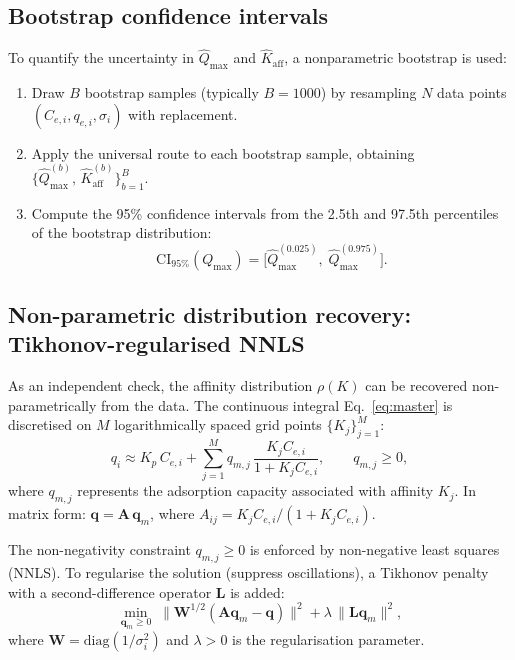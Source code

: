 \documentclass[12pt]{article}
\begin{document}
\subsection{Bootstrap confidence intervals}

To quantify the uncertainty in $\widehat{Q}_{\max}$ and
$\widehat{K}_{\mathrm{aff}}$, a nonparametric bootstrap is used:
\begin{enumerate}[nosep]
  \item Draw $B$ bootstrap samples (typically $B = 1000$) by
        resampling $N$ data points $(C_{e,i}, q_{e,i}, \sigma_i)$
        with replacement.
  \item Apply the universal route to each bootstrap sample, obtaining
        $\{\widehat{Q}_{\max}^{(b)},\, \widehat{K}_{\mathrm{aff}}^{(b)}\}_{b=1}^{B}$.
  \item Compute the 95\% confidence intervals from the 2.5th and
        97.5th percentiles of the bootstrap distribution:
        \begin{equation}
          \mathrm{CI}_{95\%}(Q_{\max})
          = \bigl[\widehat{Q}_{\max}^{(0.025)},\;
                   \widehat{Q}_{\max}^{(0.975)}\bigr].
        \end{equation}
\end{enumerate}

\subsection{Non-parametric distribution recovery: Tikhonov-regularised NNLS}

As an independent check, the affinity distribution $\rho(K)$ can be
recovered non-parametrically from the data.  The continuous integral
Eq.~\eqref{eq:master} is discretised on $M$ logarithmically spaced
grid points $\{K_j\}_{j=1}^{M}$:
\begin{equation}
  q_i \approx K_p\,C_{e,i}
  + \sum_{j=1}^{M} q_{m,j}\,\frac{K_j C_{e,i}}{1 + K_j C_{e,i}},
  \qquad q_{m,j} \ge 0,
  \label{eq:NNLS_discrete}
\end{equation}
where $q_{m,j}$ represents the adsorption capacity associated with
affinity $K_j$.  In matrix form: $\mathbf{q} = \mathbf{A}\,\mathbf{q}_m$,
where $A_{ij} = K_j C_{e,i}/(1 + K_j C_{e,i})$.

The non-negativity constraint $q_{m,j} \ge 0$ is enforced by
non-negative least squares (NNLS).  To regularise the solution
(suppress oscillations), a Tikhonov penalty with a second-difference
operator $\mathbf{L}$ is added:
\begin{equation}
  \min_{\mathbf{q}_m \ge 0}\;
  \|\mathbf{W}^{1/2}(\mathbf{A}\mathbf{q}_m - \mathbf{q})\|^2
  + \lambda\,\|\mathbf{L}\mathbf{q}_m\|^2,
  \label{eq:NNLS_tikhonov}
\end{equation}
where $\mathbf{W} = \mathrm{diag}(1/\sigma_i^2)$ and $\lambda > 0$
is the regularisation parameter.
\end{document}
